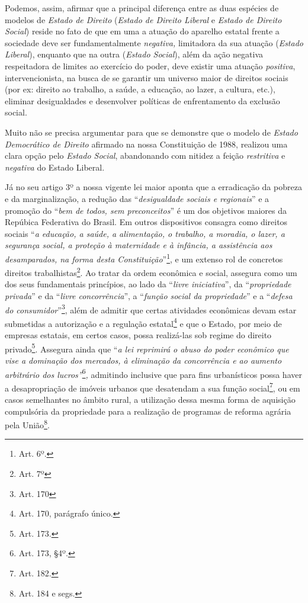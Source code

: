 Podemos, assim, afirmar que a principal diferença entre as duas espécies
de modelos de \emph{Estado de Direito} (\emph{Estado de Direito Liberal}
e \emph{Estado de Direito Social}) reside no fato de que em uma a
atuação do aparelho estatal frente a sociedade deve ser fundamentalmente
\emph{negativa,} limitadora da sua atuação (\emph{Estado Liberal}),
enquanto que na outra (\emph{Estado Social}), além da ação negativa
respeitadora de limites ao exercício do poder, deve existir uma atuação
\emph{positiva}, intervencionista, na busca de se garantir um universo
maior de direitos sociais (por ex: direito ao trabalho, a saúde, a
educação, ao lazer, a cultura, etc.), eliminar desigualdades e
desenvolver políticas de enfrentamento da exclusão social.

Muito não se precisa argumentar para que se demonstre que o modelo de
\emph{Estado Democrático de Direito} afirmado na nossa Constituição de
1988, realizou uma clara opção pelo \emph{Estado Social}, abandonando
com nitidez a feição \emph{restritiva} e \emph{negativa} do Estado
Liberal.

Já no seu artigo 3º a nossa vigente lei maior aponta que a erradicação
da pobreza e da marginalização, a redução das ``\emph{desigualdade
sociais e regionais}'' e a promoção do ``\emph{bem de todos, sem
preconceitos}'' é um dos objetivos maiores da Repúbica Federativa do
Brasil. Em outros dispositivos consagra como direitos sociais ``\emph{a
educação, a saúde, a alimentação, o trabalho, a moradia, o lazer, a
segurança social, a proteção à maternidade e à infância, a assistência
aos desamparados, na forma desta Constituição}''\footnote{Art. 6º.}, e
um extenso rol de concretos direitos trabalhistas\footnote{Art. 7º}. Ao
tratar da ordem econômica e social, assegura como um dos seus
fundamentais princípios, ao lado da ``\emph{livre iniciativa}'', da
``\emph{propriedade privada}'' e da ``\emph{livre concorrência}'', a
``\emph{função social da propriedade}'' e a ``\emph{defesa do
consumidor}''\footnote{Art. 170}, além de admitir que certas atividades
econômicas devam estar submetidas a autorização e a regulação
estatal\footnote{Art. 170, parágrafo único.} e que o Estado, por meio de
empresas estatais, em certos casos, possa realizá-las sob regime do
direito privado\footnote{Art. 173.}. Assegura ainda que ``\emph{a lei
reprimirá o abuso do poder econômico que vise a dominação dos mercados,
à eliminação da concorrência e ao aumento arbitrário dos
lucros''}\footnote{Art. 173, §4º.}\emph{,} admitindo inclusive que para
fins urbanísticos possa haver a desapropriação de imóveis urbanos que
desatendam a sua função social\footnote{Art. 182.}, ou em casos
semelhantes no âmbito rural, a utilização dessa mesma forma de aquisição
compulsória da propriedade para a realização de programas de reforma
agrária pela União\footnote{Art. 184 e segs.}.

